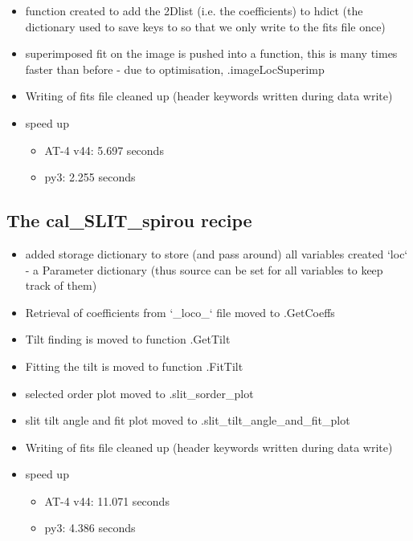 \begin{itemize}
\item function created to add the 2Dlist (i.e. the coefficients) to hdict (the dictionary used to save keys to so that we only write to the fits file once)

\item superimposed fit on the image is pushed into a function, this is many times faster than before - due to optimisation, \spirouLOCOR.imageLocSuperimp

\item Writing of fits file cleaned up (header keywords written during data write)

\item speed up
	\begin{itemize}
	\item AT-4 v44: 5.697 seconds
	\item py3:  2.255 seconds
    \end{itemize}

\end{itemize}

\subsection{The cal\_SLIT\_spirou recipe}
\label{ch:changelog:At4:cal_SLIT_spirou}

\begin{itemize}
\item added storage dictionary to store (and pass around) all variables created `loc` - a Parameter dictionary (thus source can be set for all variables to keep track of them)

\item Retrieval of coefficients from `\_loco\_` file moved to \spirouLOCOR.GetCoeffs

\item Tilt finding is moved to function \spirouImage.GetTilt

\item Fitting the tilt is moved to function \spirouImage.FitTilt

\item selected order plot moved to \spirouPlot.slit\_sorder\_plot

\item slit tilt angle and fit plot moved to \spirouPlot.slit\_tilt\_angle\_and\_fit\_plot

\item Writing of fits file cleaned up (header keywords written during data write)

\item speed up
	\begin{itemize}
	\item AT-4 v44: 11.071 seconds
	\item py3: 4.386 seconds
    \end{itemize}

\end{itemize}

